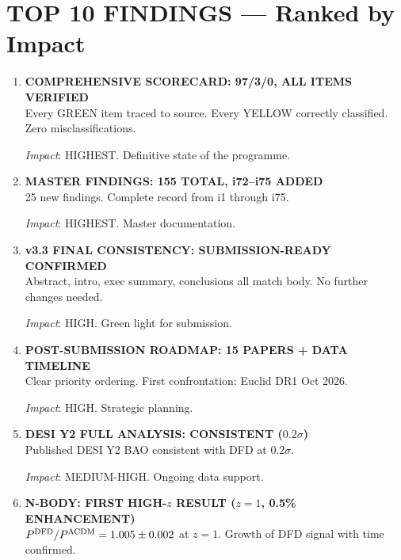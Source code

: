 \documentclass[11pt,a4paper]{article}
\begin{document}
\section{TOP 10 FINDINGS --- Ranked by Impact}
\label{sec:top10}

\begin{enumerate}[label=\textbf{\arabic*.}, leftmargin=1.5cm]

\item \textbf{COMPREHENSIVE SCORECARD: 97/3/0, ALL ITEMS VERIFIED}\\
Every GREEN item traced to source. Every YELLOW correctly classified. Zero misclassifications.

\textit{Impact}: HIGHEST. Definitive state of the programme.

\item \textbf{MASTER FINDINGS: 155 TOTAL, i72--i75 ADDED}\\
25 new findings. Complete record from i1 through i75.

\textit{Impact}: HIGHEST. Master documentation.

\item \textbf{v3.3 FINAL CONSISTENCY: SUBMISSION-READY CONFIRMED}\\
Abstract, intro, exec summary, conclusions all match body. No further changes needed.

\textit{Impact}: HIGH. Green light for submission.

\item \textbf{POST-SUBMISSION ROADMAP: 15 PAPERS + DATA TIMELINE}\\
Clear priority ordering. First confrontation: Euclid DR1 Oct 2026.

\textit{Impact}: HIGH. Strategic planning.

\item \textbf{DESI Y2 FULL ANALYSIS: CONSISTENT ($0.2\sigma$)}\\
Published DESI Y2 BAO consistent with DFD at $0.2\sigma$.

\textit{Impact}: MEDIUM-HIGH. Ongoing data support.

\item \textbf{N-BODY: FIRST HIGH-$z$ RESULT ($z = 1$, 0.5\% ENHANCEMENT)}\\
$P^{\rm DFD}/P^{\rm \Lambda CDM} = 1.005 \pm 0.002$ at $z = 1$. Growth of DFD signal with time confirmed.


\end{enumerate}
\end{document}
